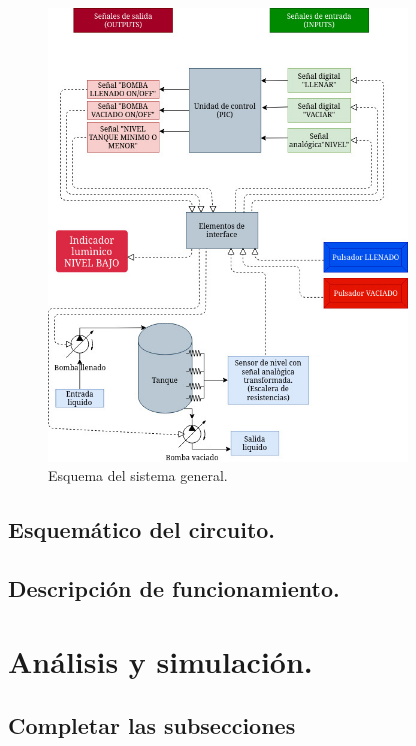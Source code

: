 \documentclass[a4paper]{article}
\begin{document}
    \begin{figure}[h]\centering
        \includegraphics[height=12cm]{diagrama_sistema.jpg}
        \caption{Esquema del sistema general.}\label{fig:esquematico1}
    \end{figure}

    \subsection{Esquemático del circuito.}

    \subsection{Descripción de funcionamiento.}



    
\section{Análisis y simulación.}

\subsection{Completar las subsecciones}
\end{document}

